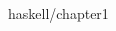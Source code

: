 \documentclass[a4paper,11pt]{book}
\begin{document}
\begin{CJK}{UTF8}{song}

\CJKtilde
\CJKindent
 {haskell/chapter1}

\newpage
\end{CJK}
\end{document}
